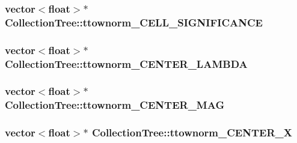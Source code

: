 \subsubsection[{\texorpdfstring{ttownorm\+\_\+\+C\+E\+L\+L\+\_\+\+S\+I\+G\+N\+I\+F\+I\+C\+A\+N\+CE}{ttownorm_CELL_SIGNIFICANCE}}]{\setlength{\rightskip}{0pt plus 5cm}vector$<$float$>$$\ast$ Collection\+Tree\+::ttownorm\+\_\+\+C\+E\+L\+L\+\_\+\+S\+I\+G\+N\+I\+F\+I\+C\+A\+N\+CE}\hypertarget{classCollectionTree_afd34b7827c619795c3a4281a667005d1}{}\label{classCollectionTree_afd34b7827c619795c3a4281a667005d1}
\subsubsection[{\texorpdfstring{ttownorm\+\_\+\+C\+E\+N\+T\+E\+R\+\_\+\+L\+A\+M\+B\+DA}{ttownorm_CENTER_LAMBDA}}]{\setlength{\rightskip}{0pt plus 5cm}vector$<$float$>$$\ast$ Collection\+Tree\+::ttownorm\+\_\+\+C\+E\+N\+T\+E\+R\+\_\+\+L\+A\+M\+B\+DA}\hypertarget{classCollectionTree_a0e2bbcadf82a3c8e5f84133d45bb5c3d}{}\label{classCollectionTree_a0e2bbcadf82a3c8e5f84133d45bb5c3d}
\subsubsection[{\texorpdfstring{ttownorm\+\_\+\+C\+E\+N\+T\+E\+R\+\_\+\+M\+AG}{ttownorm_CENTER_MAG}}]{\setlength{\rightskip}{0pt plus 5cm}vector$<$float$>$$\ast$ Collection\+Tree\+::ttownorm\+\_\+\+C\+E\+N\+T\+E\+R\+\_\+\+M\+AG}\hypertarget{classCollectionTree_a4389b354ed96ba9cb13bf3df1c929d81}{}\label{classCollectionTree_a4389b354ed96ba9cb13bf3df1c929d81}
\subsubsection[{\texorpdfstring{ttownorm\+\_\+\+C\+E\+N\+T\+E\+R\+\_\+X}{ttownorm_CENTER_X}}]{\setlength{\rightskip}{0pt plus 5cm}vector$<$float$>$$\ast$ Collection\+Tree\+::ttownorm\+\_\+\+C\+E\+N\+T\+E\+R\+\_\+X}\hypertarget{classCollectionTree_a828f6cb7bbd8adbd36170b75d9032599}{}\label{classCollectionTree_a828f6cb7bbd8adbd36170b75d9032599}
